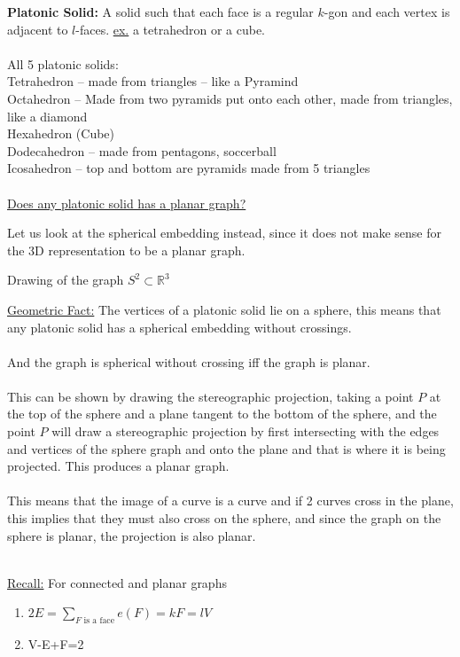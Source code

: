 \documentclass[12pt]{article}
\begin{document}
\textbf{Platonic Solid:} A solid such that each face is a regular $k$-gon and each vertex is adjacent to $l$-faces. \underline{ex.} a tetrahedron or a cube.\\
\\
All 5 platonic solids:\\
Tetrahedron -- made from triangles -- like a Pyramind\\
Octahedron -- Made from two pyramids put onto each other, made from triangles, like a diamond\\
Hexahedron (Cube)\\
Dodecahedron -- made from pentagons, soccerball\\
Icosahedron -- top and bottom are pyramids made from 5 triangles
\\
\\
\underline{Does any platonic solid has a planar graph?}

Let us look at the spherical embedding instead, since it does not make sense for the 3D representation to be a planar graph.

\begin{tcolorbox}[title=Definition: Spherical Embedding]
	Drawing of the graph $S^2 \subset \mathbb{R}^3$
\end{tcolorbox}

\underline{Geometric Fact:} The vertices of a platonic solid lie on a sphere, this means that any platonic solid has a spherical embedding without crossings.\\
\\
And the graph is spherical without crossing iff the graph is planar.\\
\\
This can be shown by drawing the stereographic projection, taking a point $P$ at the top of the sphere and a plane tangent to the bottom of the sphere, and the point $P$ will draw a stereographic projection by first intersecting with the edges and vertices of the sphere graph and onto the plane and that is where it is being projected. This produces a planar graph.\\
\\
This means that the image of a curve is a curve and if 2 curves cross in the plane, this implies that they must also cross on the sphere, and since the graph on the sphere is planar, the projection is also planar.\\
\\
\begin{tcolorbox}
	\underline{Recall:} For connected and planar graphs
	\begin{enumerate}
		\item{$2E = \sum_{F \text{ is a face}} e(F) = kF = lV$}
		\item{V-E+F=2}
	\end{enumerate}
\end{tcolorbox}
\end{document}
